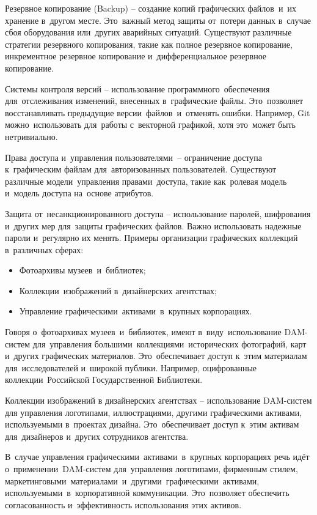 \documentclass{ou}
\begin{document}
Резервное копирование (Backup) -- создание копий графических файлов~и~их хранение в~другом месте. Это~важный метод защиты от~потери данных в~случае сбоя оборудования или~других аварийных ситуаций. Существуют различные стратегии резервного копирования, такие как полное резервное копирование, инкрементное резервное копирование и~дифференциальное резервное копирование.

Системы контроля версий -- использование программного~обеспечения для~отслеживания изменений, внесенных в~графические файлы. Это~позволяет восстанавливать предыдущие версии~файлов~и~отменять ошибки. Например, Git можно~использовать для~работы с~векторной графикой, хотя это~может быть нетривиально.

Права доступа и~управления пользователями~-- ограничение доступа к~графическим файлам для~авторизованных пользователей. Существуют различные модели~управления правами~доступа, такие как~ролевая модель и~модель доступа на~основе атрибутов.

Защита от~несанкционированного доступа -- использование паролей, шифрования и~других мер для~защиты графических файлов. Важно использовать надежные пароли и~регулярно их менять.
Примеры организации графических коллекций в~различных сферах:
\begin{itemize}[label=-, leftmargin=0em, itemindent=3.35em, nosep]
\item Фотоархивы музеев~и~библиотек;
\item Коллекции~изображений в~дизайнерских агентствах;
\item Управление графическими~активами~в~крупных корпорациях.
\end{itemize}

Говоря о~фотоархивах музеев~и~библиотек, имеют в~виду~использование DAM-систем для~управления большими~коллекциями~исторических фотографий, карт и~других графических материалов. Это~обеспечивает доступ к~этим материалам для~исследователей и~широкой публики. Например, оцифрованные коллекции~Российской Государственной Библиотеки.

Коллекции изображений в дизайнерских агентствах -- использование DAM-систем для управления логотипами, иллюстрациями, другими графическими активами, используемыми в~проектах дизайна. Это~обеспечивает доступ к~этим активам для~дизайнеров и~других сотрудников агентства.

В~случае управления графическими~активами~в~крупных корпорациях речь идёт о~применении~DAM-систем для~управления логотипами, фирменным стилем, маркетинговыми~материалами~и~другими~графическими~активами, используемыми~в~корпоративной коммуникации. Это~позволяет обеспечить согласованность и~эффективность использования этих активов.
\end{document}
